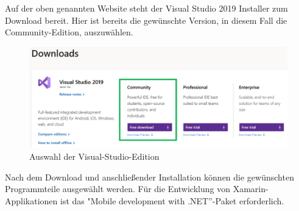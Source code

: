 




Auf der oben genannten Website steht der Visual Studio 2019 Installer zum Download bereit.
Hier ist bereits die gewünschte Version, in diesem Fall die Community-Edition, auszuwählen.
\begin{figure}[H]
    \centering\includegraphics[width=0.9\linewidth]{images/auswahl_rahmenwerk/download.png}    
    \caption{Auswahl der Visual-Studio-Edition}
\end{figure}
Nach dem Download und anschließender Installation können die gewünschten Programmteile ausgewählt werden.
Für die Entwicklung von Xamarin-Applikationen ist das "Mobile development with .NET''-Paket erforderlich.


